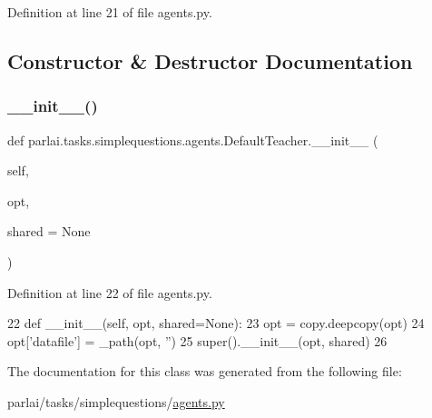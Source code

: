 Definition at line 21 of file agents.\+py.



\subsection{Constructor \& Destructor Documentation}
\mbox{\label{classparlai_1_1tasks_1_1simplequestions_1_1agents_1_1DefaultTeacher_a94f826fb0eec41783ccfdab6ba77c0d1}} 
\subsubsection{\texorpdfstring{\+\_\+\+\_\+init\+\_\+\+\_\+()}{\_\_init\_\_()}}
{\footnotesize\ttfamily def parlai.\+tasks.\+simplequestions.\+agents.\+Default\+Teacher.\+\_\+\+\_\+init\+\_\+\+\_\+ (\begin{DoxyParamCaption}\item[{}]{self,  }\item[{}]{opt,  }\item[{}]{shared = {\ttfamily None} }\end{DoxyParamCaption})}



Definition at line 22 of file agents.\+py.


\begin{DoxyCode}
22     \textcolor{keyword}{def }\_\_init\_\_(self, opt, shared=None):
23         opt = copy.deepcopy(opt)
24         opt[\textcolor{stringliteral}{'datafile'}] = \_path(opt, \textcolor{stringliteral}{''})
25         super().\_\_init\_\_(opt, shared)
26 \end{DoxyCode}


The documentation for this class was generated from the following file\+:\begin{DoxyCompactItemize}
\item 
parlai/tasks/simplequestions/\hyperlink{parlai_2tasks_2simplequestions_2agents_8py}{agents.\+py}\end{DoxyCompactItemize}
